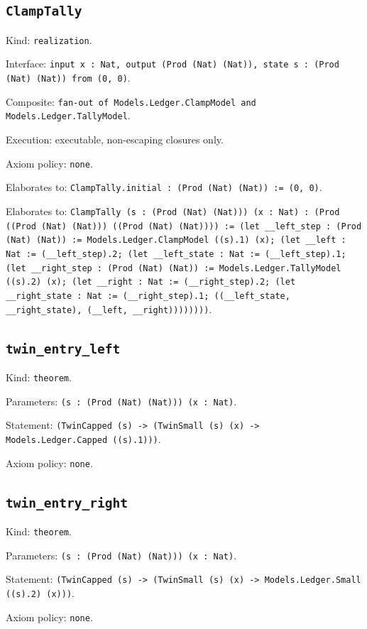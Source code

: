 \documentclass[11pt]{article}
\begin{document}
\subsection*{\texttt{ClampTally}}
\noindent Kind: \texttt{realization}.\par
\noindent Interface: \texttt{input x : Nat, output (Prod (Nat) (Nat)), state s : (Prod (Nat) (Nat)) from (0, 0)}.\par
\noindent Composite: \texttt{fan-out of Models.Ledger.ClampModel and Models.Ledger.TallyModel}.\par
\noindent Execution: executable, non-escaping closures only.\par
\noindent Axiom policy: \texttt{none}.\par
\noindent Elaborates to: \texttt{ClampTally.initial : (Prod (Nat) (Nat)) := (0, 0)}.\par
\noindent Elaborates to: \texttt{ClampTally (s : (Prod (Nat) (Nat))) (x : Nat) : (Prod ((Prod (Nat) (Nat))) ((Prod (Nat) (Nat)))) := (let \_\_left\_step : (Prod (Nat) (Nat)) := Models.Ledger.ClampModel ((s).1) (x); (let \_\_left : Nat := (\_\_left\_step).2; (let \_\_left\_state : Nat := (\_\_left\_step).1; (let \_\_right\_step : (Prod (Nat) (Nat)) := Models.Ledger.TallyModel ((s).2) (x); (let \_\_right : Nat := (\_\_right\_step).2; (let \_\_right\_state : Nat := (\_\_right\_step).1; ((\_\_left\_state, \_\_right\_state), (\_\_left, \_\_right))))))))}.\par
\subsection*{\texttt{twin\_entry\_left}}
\noindent Kind: \texttt{theorem}.\par
\noindent Parameters: \texttt{(s : (Prod (Nat) (Nat))) (x : Nat)}.\par
\noindent Statement: \texttt{(TwinCapped (s) -> (TwinSmall (s) (x) -> Models.Ledger.Capped ((s).1)))}.\par
\noindent Axiom policy: \texttt{none}.\par
\subsection*{\texttt{twin\_entry\_right}}
\noindent Kind: \texttt{theorem}.\par
\noindent Parameters: \texttt{(s : (Prod (Nat) (Nat))) (x : Nat)}.\par
\noindent Statement: \texttt{(TwinCapped (s) -> (TwinSmall (s) (x) -> Models.Ledger.Small ((s).2) (x)))}.\par
\noindent Axiom policy: \texttt{none}.\par
\end{document}
